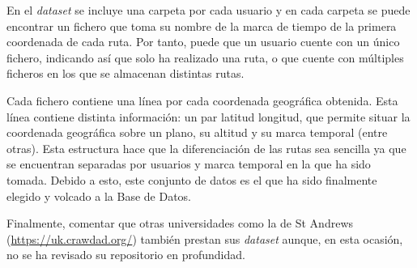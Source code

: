 En el \textit{dataset} se incluye una carpeta por cada usuario y en cada carpeta se puede encontrar un fichero que toma su nombre de la marca de tiempo de la primera coordenada de cada ruta. Por tanto, puede que un usuario cuente con un único fichero, indicando así que solo ha realizado una ruta, o que cuente con múltiples ficheros en los que se almacenan distintas rutas.

Cada fichero contiene una línea por cada coordenada geográfica obtenida. Esta línea contiene distinta información: un par latitud longitud, que permite situar la coordenada geográfica sobre un plano, su altitud y su marca temporal (entre otras). Esta estructura hace que la diferenciación de las rutas sea sencilla ya que se encuentran separadas por usuarios y marca temporal en la que ha sido tomada. Debido a esto, este conjunto de datos es el que ha sido finalmente elegido y volcado a la Base de Datos.

Finalmente, comentar que otras universidades como la de St Andrews (\url{https://uk.crawdad.org/}) también prestan sus \textit{dataset} aunque, en esta ocasión, no se ha revisado su repositorio en profundidad.
